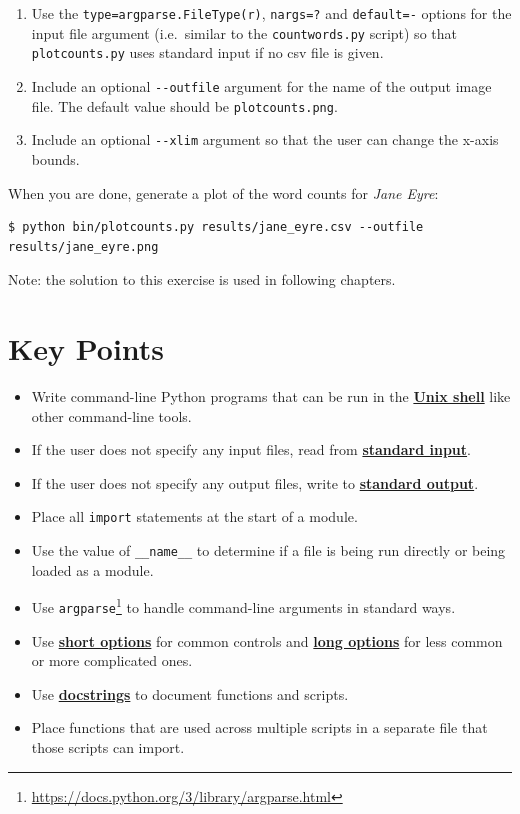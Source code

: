 \documentclass[
]{krantz}
\providecommand{\tightlist}{%
  \setlength{\itemsep}{0pt}\setlength{\parskip}{0pt}}
\renewcommand{\href}[2]{#2\footnote{\url{#1}}}
\newcommand{\gref}[2]{\hyperlink{#2}{\textbf{#1}}}
\begin{document}
\begin{enumerate}
\def\labelenumi{\arabic{enumi}.}
\item
  Use the \texttt{type=argparse.FileType(\textquotesingle{}r\textquotesingle{})}, \texttt{nargs=\textquotesingle{}?\textquotesingle{}} and \texttt{default=\textquotesingle{}-\textquotesingle{}} options
  for the input file argument (i.e.~similar to the \texttt{countwords.py} script)
  so that \texttt{plotcounts.py} uses standard input if no csv file is given.
\item
  Include an optional \texttt{-\/-outfile} argument for the name of the output image file.
  The default value should be \texttt{plotcounts.png}.
\item
  Include an optional \texttt{-\/-xlim} argument so that the user can change the x-axis bounds.
\end{enumerate}

When you are done,
generate a plot of the word counts for \emph{Jane Eyre}:

\begin{verbatim}
$ python bin/plotcounts.py results/jane_eyre.csv --outfile results/jane_eyre.png
\end{verbatim}

Note:
the solution to this exercise is used in following chapters.

\hypertarget{scripting-keypoints}{%
\section{Key Points}\label{scripting-keypoints}}

\begin{itemize}
\tightlist
\item
  Write command-line Python programs that can be run in the \gref{Unix shell}{shell} like other command-line tools.
\item
  If the user does not specify any input files, read from \gref{standard input}{stdin}.
\item
  If the user does not specify any output files, write to \gref{standard output}{stdout}.
\item
  Place all \texttt{import} statements at the start of a module.
\item
  Use the value of \texttt{\_\_name\_\_} to determine if a file is being run directly or being loaded as a module.
\item
  Use \href{https://docs.python.org/3/library/argparse.html}{\texttt{argparse}} to handle command-line arguments in standard ways.
\item
  Use \gref{short options}{short\_option} for common controls and \gref{long options}{long\_option} for less common or more complicated ones.
\item
  Use \gref{docstrings}{docstring} to document functions and scripts.
\item
  Place functions that are used across multiple scripts in a separate file that those scripts can import.
\end{itemize}
\end{document}

